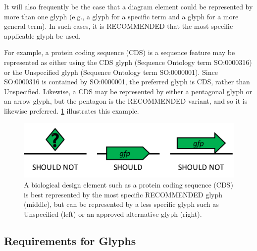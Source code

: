 It will also frequently be the case that a diagram element could be represented by more than one glyph (e.g., a glyph for a specific term and a glyph for a more general term).
In such cases, it is RECOMMENDED that the most specific applicable glyph be used.

For example, a protein coding sequence (CDS) is a sequence feature may be represented as either using the CDS glyph (Sequence Ontology term SO:0000316) or the Unspecified glyph (Sequence Ontology term SO:0000001).  
Since SO:0000316 is contained by SO:0000001, the preferred glyph is CDS, rather than Unspecified.
Likewise, a CDS may be represented by either a pentagonal glyph or an arrow glyph, but the pentagon is the RECOMMENDED variant, and so it is likewise preferred.  
\ref{f:glyphalternatives} illustrates this example.

\begin{figure}[h!]
\centering
\includegraphics[scale=0.6]{figures/glyphalternatives.pdf}
\caption{A biological design element such as a protein coding sequence (CDS) is best represented by the most specific RECOMMENDED glyph (middle), but can be represented by a less specific glyph such as Unspecified (left) or an approved alternative glyph (right).}
\label{f:glyphalternatives}
\end{figure}

\subsection{Requirements for Glyphs}


